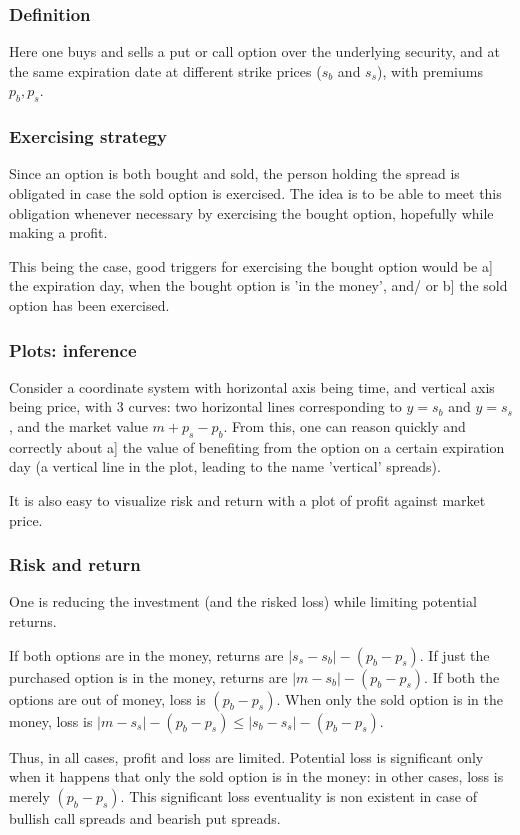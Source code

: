 \documentclass[oneside, article]{memoir}
\begin{document}
\subsubsection{Definition}
Here one buys and sells a put or call option over the underlying security, and at the same expiration date at different strike prices ($s_b$ and $s_s$), with premiums $p_b, p_s$.

\subsubsection{Exercising strategy}
Since an option is both bought and sold, the person holding the spread is obligated in case the sold option is exercised. The idea is to be able to meet this obligation whenever necessary by exercising the bought option, hopefully while making a profit.

This being the case, good triggers for exercising the bought option would be a] the expiration day, when the bought option is 'in the money', and/ or b] the sold option has been exercised.

\subsubsection{Plots: inference}
Consider a coordinate system with horizontal axis being time, and vertical axis being price, with 3 curves: two horizontal lines corresponding to $y = s_b$ and $y = s_s$, and the market value $m + p_s - p_b$. From this, one can reason quickly and correctly about a] the value of benefiting from the option on a certain expiration day (a vertical line in the plot, leading to the name 'vertical' spreads).

It is also easy to visualize risk and return with a plot of profit against market price.

\subsubsection{Risk and return}
One is reducing the investment (and the risked loss) while limiting potential returns.

If both options are in the money, returns are $|s_s - s_b| - (p_b - p_s)$. If just the purchased option is in the money, returns are $|m - s_b| - (p_b - p_s)$. If both the options are out of money, loss is $(p_b - p_s)$.  When only the sold option is in the money, loss is $|m - s_s| -(p_b - p_s) \leq |s_b - s_s| -(p_b - p_s)$.

Thus, in all cases, profit and loss are limited. Potential loss is significant only when it happens that only the sold option is in the money: in other cases, loss is merely $(p_b - p_s)$. This significant loss eventuality is non existent in case of bullish call spreads and bearish put spreads.
\end{document}
